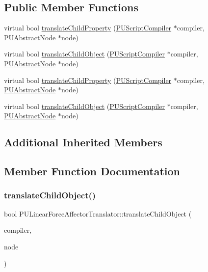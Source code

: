 \subsection*{Public Member Functions}
\begin{DoxyCompactItemize}
\item 
virtual bool \hyperlink{classPULinearForceAffectorTranslator_a83673e5f8fc1494b7e2fd755bc9f2381}{translate\+Child\+Property} (\hyperlink{classPUScriptCompiler}{P\+U\+Script\+Compiler} $\ast$compiler, \hyperlink{classPUAbstractNode}{P\+U\+Abstract\+Node} $\ast$node)
\item 
virtual bool \hyperlink{classPULinearForceAffectorTranslator_a283bb41a6dfa9a72cf480bdfbfab3422}{translate\+Child\+Object} (\hyperlink{classPUScriptCompiler}{P\+U\+Script\+Compiler} $\ast$compiler, \hyperlink{classPUAbstractNode}{P\+U\+Abstract\+Node} $\ast$node)
\item 
virtual bool \hyperlink{classPULinearForceAffectorTranslator_a49117f31b3f64755c6998fff1900ee46}{translate\+Child\+Property} (\hyperlink{classPUScriptCompiler}{P\+U\+Script\+Compiler} $\ast$compiler, \hyperlink{classPUAbstractNode}{P\+U\+Abstract\+Node} $\ast$node)
\item 
virtual bool \hyperlink{classPULinearForceAffectorTranslator_a17986b988b7509a75b39bd9f41877d9c}{translate\+Child\+Object} (\hyperlink{classPUScriptCompiler}{P\+U\+Script\+Compiler} $\ast$compiler, \hyperlink{classPUAbstractNode}{P\+U\+Abstract\+Node} $\ast$node)
\end{DoxyCompactItemize}
\subsection*{Additional Inherited Members}


\subsection{Member Function Documentation}
\mbox{\label{classPULinearForceAffectorTranslator_a283bb41a6dfa9a72cf480bdfbfab3422}} 
\subsubsection{\texorpdfstring{translate\+Child\+Object()}{translateChildObject()}\hspace{0.1cm}{\footnotesize\ttfamily [1/2]}}
{\footnotesize\ttfamily bool P\+U\+Linear\+Force\+Affector\+Translator\+::translate\+Child\+Object (\begin{DoxyParamCaption}\item[{\hyperlink{classPUScriptCompiler}{P\+U\+Script\+Compiler} $\ast$}]{compiler,  }\item[{\hyperlink{classPUAbstractNode}{P\+U\+Abstract\+Node} $\ast$}]{node }\end{DoxyParamCaption})\hspace{0.3cm}{\ttfamily [virtual]}}


